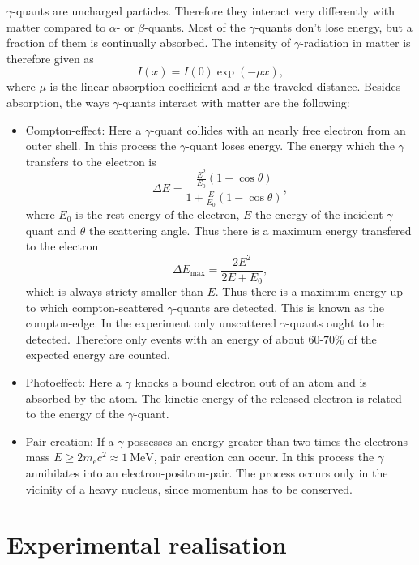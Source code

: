 $\gamma$-quants are uncharged particles. Therefore they interact very differently with matter compared to $\alpha$- or $\beta$-quants. Most of the $\gamma$-quants don't lose energy, but a fraction of them is continually absorbed. The intensity of $\gamma$-radiation in matter is therefore given as
\begin{equation}
 I(x) = I(0) \exp\left(-\mu x\right),
\end{equation}
where $\mu$ is the linear absorption coefficient and $x$ the traveled distance. Besides absorption, the ways $\gamma$-quants interact with matter are the following:
\begin{itemize}
 \item Compton-effect: Here a $\gamma$-quant collides with an nearly free electron from an outer shell. In this process the $\gamma$-quant loses energy. The energy which the $\gamma$ transfers to the electron is \cite{BB}
	\begin{equation}
	  \Delta E = \frac{\frac{E^{2}}{E_{0}}\left(1-\cos\theta\right)}{1+\frac{E}{E_{0}}\left(1-\cos\theta\right)},
	\end{equation}
	where $E_{0}$ is the rest energy of the electron, $E$ the energy of the incident $\gamma$-quant and $\theta$ the scattering angle. Thus there is a maximum energy transfered to the electron
	\begin{equation}
	 \Delta E_{\textrm{max}} = \frac{2E^{2}}{2E+E_{0}},
	\end{equation}
	which is always stricty smaller than $E$. Thus there is a maximum energy up to which compton-scattered $\gamma$-quants are detected. This is known as the compton-edge. In the experiment only unscattered $\gamma$-quants ought to be detected. Therefore only events with an energy of about $60$-$70\%$ of the expected energy are counted.
 \item Photoeffect: Here a $\gamma$ knocks a bound electron out of an atom and is absorbed by the atom. The kinetic energy of the released electron is related to the energy of the $\gamma$-quant.
 \item Pair creation: If a $\gamma$ possesses an energy greater than two times the electrons mass $E\geq2m_{e}c^{2}\approx\SI{1}{\mega\electronvolt}$, pair creation can occur. In this process the $\gamma$ annihilates into an electron-positron-pair. The process occurs only in the vicinity of a heavy nucleus, since momentum has to be conserved.
\end{itemize}


\section{Experimental realisation}

